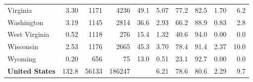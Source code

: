 \begin{tabular}{lrrrrrrrrr}
Virginia & \num{3.30} & \num{1171} & \num{4236} & \num{49.1} & \num{5.07} & \num{77.2} & \num{82.5} & \num{1.70} & \num{6.2} \\
Washington & \num{3.19} & \num{1145} & \num{2814} & \num{36.6} & \num{2.93} & \num{66.2} & \num{88.9} & \num{0.83} & \num{2.8} \\
West Virginia & \num{0.52} & \num{1118} & \num{276} & \num{15.4} & \num{1.32} & \num{40.6} & \num{94.0} & \num{0.00} & \num{0.0} \\
Wisconsin & \num{2.53} & \num{1176} & \num{2665} & \num{45.3} & \num{3.70} & \num{78.4} & \num{91.4} & \num{2.37} & \num{10.0} \\
Wyoming & \num{0.20} & \num{656} & \num{75} & \num{13.0} & \num{0.51} & \num{23.1} & \num{92.7} & \num{0.00} & \num{0.0} \\
\midrule
\textbf{United States} & \num{132.8} & \num{56133} & \num{186247} & & \num{6.21} & \num{78.6} & \num{80.6} & \num{2.29} & \num{9.7} \\
\bottomrule
\end{tabular}
